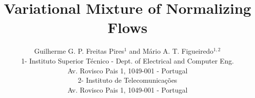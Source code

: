 \documentclass[a4paper]{esannV2}
\begin{document}
\title{Variational Mixture of Normalizing Flows}

\author{Guilherme G. P. Freitas Pires$^1$ and Mário A. T. Figueiredo$^{1,2}$
%
%
\vspace{.3cm}\\
%
1- Instituto Superior Técnico - Dept. of Electrical and Computer Eng. \\
Av. Rovisco Pais 1, 1049-001 - Portugal
%
\vspace{.1cm}\\
2- Instituto de Telecomunicações \\
Av. Rovisco Pais 1, 1049-001 - Portugal
}


\maketitle

\begin{abstract}

\end{abstract}








\begin{footnotesize}



\printbibliography

\end{footnotesize}

\end{document}
